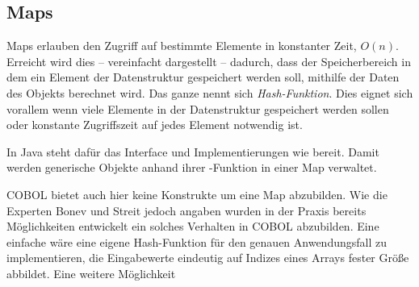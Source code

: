 \subsection{Maps}
Maps erlauben den Zugriff auf bestimmte Elemente in konstanter Zeit, \dh $O(n)$. Erreicht wird dies -- vereinfacht dargestellt -- dadurch, dass der Speicherbereich in dem ein Element der Datenstruktur gespeichert werden soll, mithilfe der Daten des Objekts berechnet wird. Das ganze nennt sich \textit{Hash-Funktion}. Dies eignet sich vorallem wenn viele Elemente in der Datenstruktur gespeichert werden sollen oder konstante Zugriffszeit auf jedes Element notwendig ist.

In Java steht dafür das Interface  und Implementierungen wie  bereit. Damit werden generische Objekte anhand ihrer -Funktion in einer Map verwaltet.

COBOL bietet auch hier keine Konstrukte um eine Map abzubilden. Wie die Experten Bonev und Streit jedoch angaben wurden in der Praxis bereits Möglichkeiten entwickelt ein solches Verhalten in COBOL abzubilden. Eine einfache wäre eine eigene Hash-Funktion für den genauen Anwendungsfall zu implementieren, die Eingabewerte eindeutig auf Indizes eines Arrays fester Größe abbildet. Eine weitere Möglichkeit 